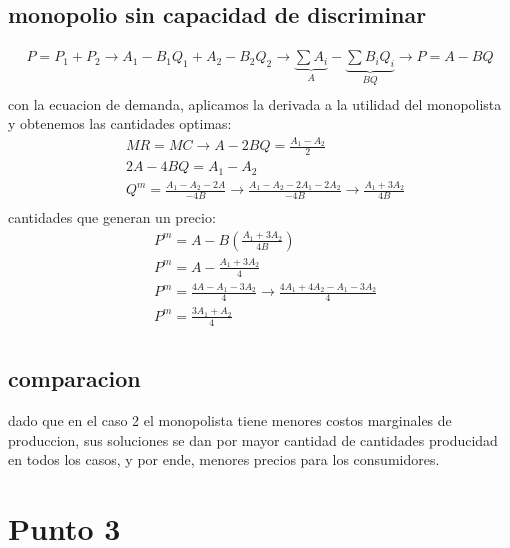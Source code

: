 \documentclass[11pt]{article}
\begin{document}
\subsection{monopolio sin capacidad de discriminar}
\begin{flushleft}
    \begin{align*}
        P=P_1+P_2 \to A_1-B_1Q_1+A_2-B_2Q_2 \to \underbrace{\sum A_i}_{A}-\underbrace{\sum B_iQ_i}_{BQ} \to P=A-BQ\\
    \end{align*}
    con la ecuacion de demanda, aplicamos la derivada a la utilidad del monopolista y obtenemos las cantidades optimas:
    \begin{align*}
        &MR = MC \to A-2BQ = \frac{A_1-A_2}{2}\\
        &2A-4BQ = A_1-A_2\\
        &Q^m=\frac{A_1-A_2-2A}{-4B} \to \frac{A_1-A_2-2A_1-2A_2}{-4B} \to \frac{A_1+3A_2}{4B}\\
    \end{align*}
    cantidades que generan un precio:
    \begin{align*}
        &P^m=A-B\left(\frac{A_1+3A_2}{4B}\right)\\
        &P^m=A-\frac{A_1+3A_2}{4}\\
        &P^m = \frac{4A-A_1-3A_2}{4} \to \frac{4A_1+4A_2-A_1-3A_2}{4}\\
        &P^m = \frac{3A_1+A_2}{4}\\
    \end{align*}
\end{flushleft}
\subsection{comparacion}
\begin{flushleft}
    dado que en el caso 2 el monopolista tiene menores costos marginales de produccion, sus soluciones se dan por mayor cantidad de cantidades producidad en todos
    los casos, y por ende, menores precios para los consumidores.
\end{flushleft}
\section{Punto 3}
\begin{flushleft}

\end{flushleft}
\end{document}

